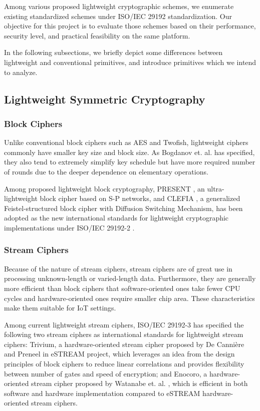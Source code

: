 Among various proposed lightweight cryptographic schemes, we enumerate existing standardized schemes under ISO/IEC 29192 standardization. Our objective for this project is to evaluate those schemes based on their performance, security level, and practical feasibility on the same platform.

In the following subsections, we briefly depict some differences between lightweight and conventional primitives, and introduce primitives which we intend to analyze. 

\subsection{Lightweight Symmetric Cryptography}

\subsubsection{Block Ciphers}

Unlike conventional block ciphers such as AES and Twofish, lightweight ciphers commonly have smaller key size and block size. As Bogdanov et. al. \cite{Cazorla:2013} has specified, they also tend to extremely simplify key schedule but have more required number of rounds due to the deeper dependence on elementary operations. 

Among proposed lightweight block cryptography, PRESENT \cite{Bogdanov:2007}, an ultra-lightweight block cipher based on S-P networks, and CLEFIA \cite{Shirai:2007}, a generalized Feistel-structured block cipher with Diffusion Switching Mechanism, has been adopted as the new international standards for lightweight cryptographic implementations under ISO/IEC 29192-2 \cite{ISO29192-2:2012}. 

\subsubsection{Stream Ciphers}

Because of the nature of stream ciphers, stream ciphers are of great use in processing unknown-length or varied-length data. Furthermore, they are generally more efficient than block ciphers that software-oriented ones take fewer CPU cycles and hardware-oriented ones require smaller chip area. These characteristics make them suitable for \gls{IoT} settings.

Among current lightweight stream ciphers, ISO/IEC 29192-3 \cite{ISO29192-3:2012} has specified the following two stream ciphers as international standards for lightweight stream ciphers: Trivium, a hardware-oriented stream cipher proposed by De Cannière and Preneel \cite{DeCanniere:2006} in eSTREAM project, which leverages an idea from the design principles of block ciphers to reduce linear correlations and provides flexibility between number of gates and speed of encryption; and Enocoro, a hardware-oriented stream cipher proposed by Watanabe et. al. \cite{Watanabe:2008}, which is efficient in both software and hardware implementation compared to eSTREAM hardware-oriented stream ciphers.

